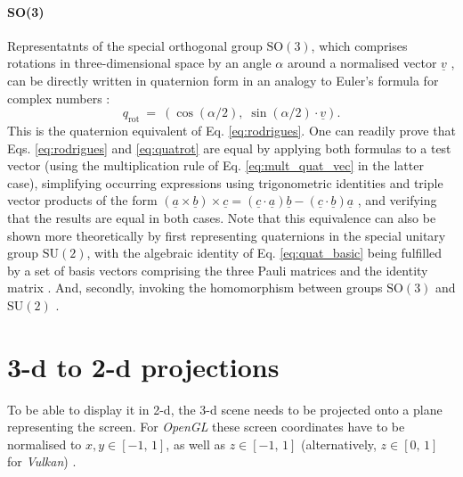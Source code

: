 \paragraph{SO(3)}
Representatnts of the special orthogonal group $\mathrm{SO\left(3\right)}$, which comprises rotations in 
three-dimensional space by an angle $\alpha$ around a normalised vector $\underline{v}$ \cite[pp. 849-851]{Arfken2013},
can be directly written in quaternion form in an analogy to Euler's formula for complex numbers \cite{wiki_quatrot}:
\begin{equation}
	\boxed{
	q_{\mathrm{rot}} \ =\ \left(\cos\left(\alpha/2 \right),\; \sin\left(\alpha/2 \right) \cdot \underline{v} \right).
	}
	\label{eq:quatrot}
\end{equation}
This is the quaternion equivalent of Eq. \ref{eq:rodrigues}. One can readily prove that Eqs. \ref{eq:rodrigues} and \ref{eq:quatrot} are equal by applying both formulas to a test vector (using the multiplication rule of Eq.
\ref{eq:mult_quat_vec} in the  latter case), simplifying occurring expressions using trigonometric 
identities \cite{wiki_trig} and triple vector products of the form 
$\left(\underline{a} \times \underline{b}\right) \times \underline{c} = 
	\left( \underline{c}\cdot \underline{a} \right) \underline{b} - 
	\left( \underline{c}\cdot \underline{b} \right) \underline{a}$ \cite{wiki_tripleprod},
and verifying that the results are equal in both cases.
Note that this equivalence can also be shown more theoretically by first representing quaternions in the 
special unitary group $\mathrm{SU\left(2\right)}$, with the algebraic identity of 
Eq. \ref{eq:quat_basic} being fulfilled by a set of basis vectors comprising the three Pauli matrices and the 
identity matrix \cite[p. 116]{Arfken2013}. And, secondly, invoking the homomorphism 
between groups $\mathrm{SO\left(3\right)}$ and $\mathrm{SU\left(2\right)}$ \cite[pp. 851-852]{Arfken2013}.


\section{3-d to 2-d projections}
\label{sec:gl_projs}
To be able to display it in 2-d, the 3-d scene needs to be projected onto a plane representing the screen.
For \textit{OpenGL} these screen coordinates have to be normalised to $x, y \in \left[-1,\, 1\right]$,
as well as $z \in \left[-1,\, 1\right]$ (alternatively, $z \in \left[0,\, 1\right]$ for \textit{Vulkan}) 
\cite{web_QVulkanWindow}.


